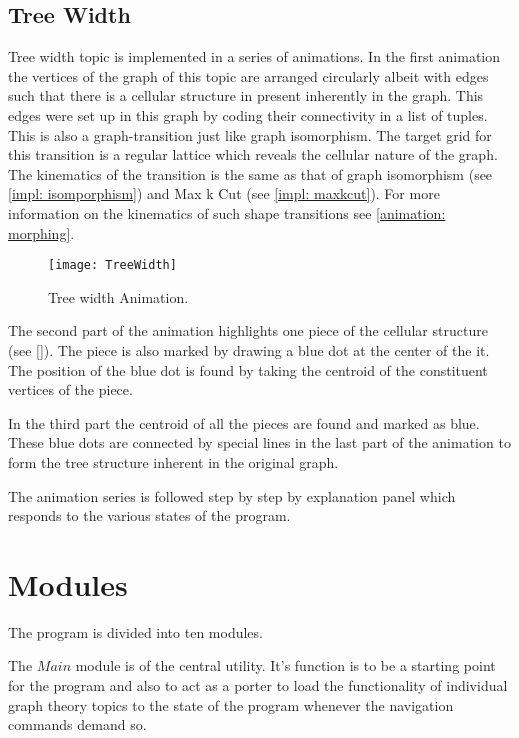 \subsection{Tree Width}
Tree width topic is implemented in a series of animations.  In the first
animation the vertices of the graph of this topic are arranged circularly
albeit with edges such that there is a cellular structure in present inherently
in the graph. This edges were set up in this graph by coding their connectivity
in a list of tuples.
This is also a graph-transition just like graph isomorphism. The target grid
for this transition is a regular lattice which reveals the cellular nature of
the graph. The kinematics of the transition is the same as that of graph
isomorphism (see \autoref{impl: isomporphism}) and Max k Cut (see
\autoref{impl: maxkcut}). For more information on the kinematics of such shape
transitions see \autoref{animation: morphing}.

\begin{figure}[ht]
\centering
\texttt{[image: TreeWidth]}
\caption{
        Tree width Animation.
        }
\label{animationfigure: vertexCover}
\end{figure}

The second part of the animation highlights one piece of the cellular structure
(see \autoref{}). The piece is also marked by drawing a blue dot at the center
of the it. The position of the blue dot is found by  taking the centroid of the
constituent vertices of the piece.

In the third part the centroid of all the pieces are found and marked as blue.
These blue dots are connected by special lines in the last part of the
animation to form the tree structure inherent in the original graph.

The animation series is followed step by step by explanation panel which responds
to the various states of the program.

\section{Modules}

The program is divided into ten modules.

The $Main$ module is of the central utility. It's function is to be a
starting point for the program and also to act as a porter to load the
functionality of individual graph theory topics to the state of the program
whenever the navigation commands demand so. 

